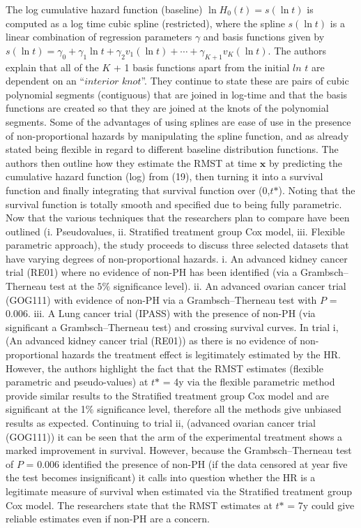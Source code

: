 \documentclass[12pt,twoside]{reedthesis}
\begin{document}
The log cumulative hazard function (baseline) \(\ln H_{0}(t)=s(\ln t)\) is computed as a log time cubic spline (restricted), where the spline \(s(\ln t)\) is a linear combination of regression parameters \(\gamma\) and basis functions given by \(s(\ln t)=\gamma_{0}+\gamma_{1} \ln t+\gamma_{2} v_{1}(\ln t)+\cdots+\gamma_{K+1} v_{K}(\ln t)\). The authors explain that all of the \(\textit{K}\) + 1 basis functions apart from the initial \(\textit{ln t}\) are dependent on an ``\(\textit{interior knot}\)''. They continue to state these are pairs of cubic polynomial segments (contiguous) that are joined in log-time and that the basis functions are created so that they are joined at the knots of the polynomial segments.
Some of the advantages of using splines are ease of use in the presence of non-proportional hazards by manipulating the spline function, and as already stated being flexible in regard to different baseline distribution functions.
The authors then outline how they estimate the RMST at time \(\textbf{x}\) by predicting the cumulative hazard function (log) from (19), then turning it into a survival function and finally integrating that survival function over (0,\(\textit{t*}\)). Noting that the survival function is totally smooth and specified due to being fully parametric.
Now that the various techniques that the researchers plan to compare have been outlined (i. Pseudovalues, ii. Stratified treatment group Cox model, iii. Flexible parametric approach), the study proceeds to discuss three selected datasets that have varying degrees of non-proportional hazards. i. An advanced kidney cancer trial (RE01) where no evidence of non-PH has been identified (via a Grambsch--Therneau test at the \(5\%\) significance level). ii. An advanced ovarian cancer trial (GOG111) with evidence of non-PH via a Grambsch--Therneau test with \(\textit{P}\) = 0.006. iii. A Lung cancer trial (IPASS) with the presence of non-PH (via significant a Grambsch--Therneau test) and crossing survival curves.
In trial i, (An advanced kidney cancer trial (RE01)) as there is no evidence of non-proportional hazards the treatment effect is legitimately estimated by the HR. However, the authors highlight the fact that the RMST estimates (flexible parametric and pseudo-values) at \(\textit{t*}\) = 4y via the flexible parametric method provide similar results to the Stratified treatment group Cox model and are significant at the 1\(\%\) significance level, therefore all the methods give unbiased results as expected.
Continuing to trial ii, (advanced ovarian cancer trial (GOG111)) it can be seen that the arm of the experimental treatment shows a marked improvement in survival. However, because the Grambsch--Therneau test of \(\textit{P}\) = 0.006 identified the presence of non-PH (if the data censored at year five the test becomes insignificant) it calls into question whether the HR is a legitimate measure of survival when estimated via the Stratified treatment group Cox model. The researchers state that the RMST estimates at \(\textit{t*}\) = 7y could give reliable estimates even if non-PH are a concern.\\
\end{document}
